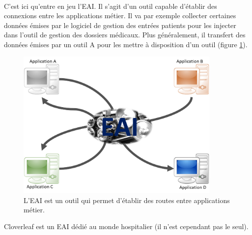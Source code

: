 			\paragraph{}%
			C'est ici qu'entre en jeu l'EAI. Il s'agit d'un outil capable d'établir des
			connexions entre les applications métier. Il va par exemple collecter
			certaines données émises par le logiciel de gestion des entrées patients
			pour les injecter dans l'outil de gestion des dossiers médicaux. Plus
			généralement, il transfert des données émises par un outil A pour les
			mettre à disposition d'un outil (figure \ref{intro_interop}).
			\begin{figure}[H]
				\centering
				\includegraphics[width=10cm]{../img/eai_1.png}
				\caption{\label{intro_interop} L'EAI est un outil qui permet
				d'établir des routes entre applications métier.}
			\end{figure}
			Cloverleaf est un EAI dédié au monde hospitalier (il n'est cependant pas le
			seul).
			
